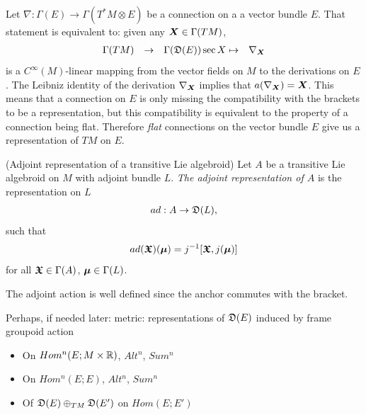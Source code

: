 \begin{example}
Let $\nabla: \Gamma(E) \to \Gamma(T^*M \otimes E)$ be a connection on a a vector bundle $E$. That statement is equivalent to: given any $\bm{X} \in \Gamma(TM)$,
\begin{align*}
    \Gamma(TM) && \to && \Gamma(\mathfrak{D}(E))
    \sec X &\mapsto& \nabla_{\bm{X}}
\end{align*}
is a $C^\infty(M)$-linear mapping from the vector fields on $M$ to the derivations on $E$. The Leibniz identity of the derivation $\nabla_{\bm{X}}$ implies that $a(\nabla_{\bm{X}}) = \bm{X}$. This means that a connection on $E$ is only missing the compatibility with the brackets to be a representation, but this compatibility is equivalent to the property of a connection being flat. Therefore \emph{flat} connections on the vector bundle $E$ give us a representation of $TM$ on $E$.
\end{example}

\begin{definition}(Adjoint representation of a transitive Lie algebroid)\label{defnAdjointAct}
Let $A$ be a transitive Lie algebroid on $M$ with adjoint bundle $L$. \emph{The adjoint representation of $A$} is the representation on $L$
\begin{align*}
    ad: A \to \mathfrak{D}(L), 
\end{align*}
such that
\begin{align*}
     ad(\bm{\mathfrak{X}})(\bm{\mu}) = j^{-1}[\bm{\mathfrak{X}}, j(\bm{\mu})]
\end{align*}
for all $\bm{\mathfrak{X}} \in \Gamma(A)$, $\bm{\mu} \in \Gamma(L)$.
\end{definition}
The adjoint action is well defined since the anchor commutes with the bracket.

Perhaps, if needed later: metric: representations of $\mathfrak{D}(E)$ induced by frame groupoid action
    \begin{itemize}
    
    \item On $Hom^n(E; M \times \mathbb{R})$, $Alt^n$, $Sum^n$
    
    \item On $Hom^n(E; E)$, $Alt^n$, $Sum^n$
    
    \item Of $\mathfrak{D}(E)\oplus_{TM} \mathfrak{D}(E')$ on $Hom(E; E')$
    
    \end{itemize}


